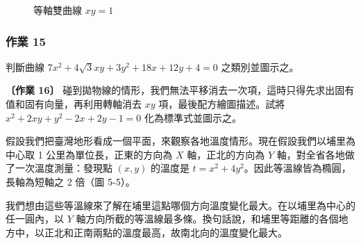 \begin{figure}[htbp]
\centering
{}
\caption{等軸雙曲線 $xy = 1$}
\label{fig:b4s-ch4-fig5-4}
\end{figure}

\subsubsection*{作業 15}
判斷曲線 $7x^2 + 4\sqrt{3}xy + 3y^2 + 18x + 12y + 4 = 0$ 之類別並圖示之。

\textbf{〔作業 16〕} 碰到拋物線的情形，我們無法平移消去一次項，這時只得先求出固有值和固有向量，再利用轉軸消去 $xy$ 項，最後配方繪圖描述。試將 $x^2 + 2xy + y^2 - 2x + 2y - 1 = 0$ 化為標準式並圖示之。

\begin{discussion}

\end{discussion}

假設我們把臺灣地形看成一個平面，來觀察各地溫度情形。現在假設我們以埔里為中心取 1 公里為單位長，正東的方向為 $X$ 軸，正北的方向為 $Y$ 軸，對全省各地做了一次溫度測量：發現點 $(x, y)$ 的溫度是 $t = x^2 + 4y^2$。因此等溫線皆為橢圓，長軸為短軸之 2 倍（圖 5-5）。

我們想由這些等溫線來了解在埔里這點哪個方向溫度變化最大。在以埔里為中心的任一圓內，以 $Y$ 軸方向所截的等溫線最多條。換句話說，和埔里等距離的各個地方中，以正北和正南兩點的溫度最高，故南北向的溫度變化最大。

